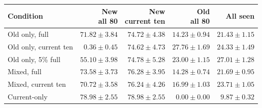 \begin{tabular}{lrrrr}
\toprule
Condition & \shortstack{New\\all 80} & \shortstack{New\\current ten} & \shortstack{Old\\all 80} & All seen\\
\midrule
Old only, full & $71.82\pm3.84$ & $74.72\pm4.38$ & $14.23\pm0.94$ & $21.43\pm1.15$\\
Old only, current ten & $0.36\pm0.45$ & $74.62\pm4.73$ & $27.76\pm1.69$ & $24.33\pm1.49$\\
Old only, 5\% full & $55.10\pm3.98$ & $74.78\pm5.28$ & $23.00\pm1.15$ & $27.01\pm1.28$\\
Mixed, full & $73.58\pm3.73$ & $76.28\pm3.95$ & $14.28\pm0.74$ & $21.69\pm0.95$\\
Mixed, current ten & $70.72\pm3.58$ & $76.24\pm4.26$ & $16.99\pm1.03$ & $23.71\pm1.05$\\
Current-only & $78.98\pm2.55$ & $78.98\pm2.55$ & $0.00\pm0.00$ & $9.87\pm0.32$\\
\bottomrule
\end{tabular}
